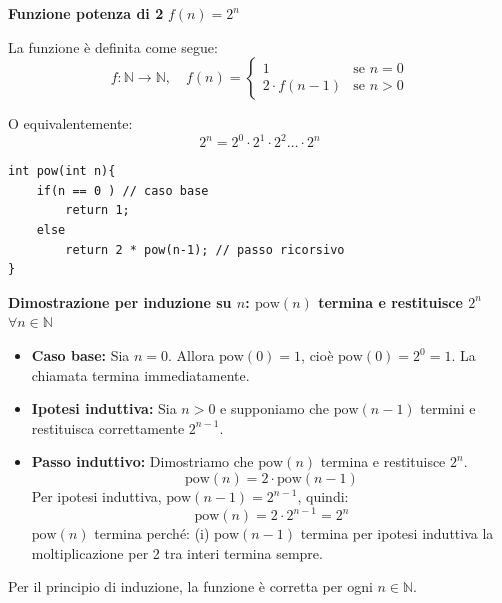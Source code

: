 \begin{esempio}
\textbf{Funzione potenza di 2} $f(n)= 2^n$

La funzione è definita come segue:
\[
f: \mathbb{N} \to \mathbb{N}, \quad f(n)= 
\begin{cases}
    1  & \text{se } n = 0 \\
    2 \cdot f(n-1)  & \text{se } n >0
\end{cases}
\]

O equivalentemente:
\[
2^n = 2^0 \cdot 2^1 \cdot 2^2 \ldots \cdot 2^n
\]

\begin{tcolorbox}[
    colback=backcolour, 
    colframe=framegray, 
    boxrule=0.5pt, 
    sharp corners,
    left=5mm, right=5mm, 
    top=5mm, bottom=5mm,
    width=\linewidth
]
\begin{lstlisting}
int pow(int n){
    if(n == 0 ) // caso base
        return 1;
    else 
        return 2 * pow(n-1); // passo ricorsivo
}
\end{lstlisting}
\end{tcolorbox}


\textbf{Dimostrazione per induzione su $n$: $\text{pow}(n)$ termina e restituisce $2^n$ $\forall n \in \mathbb{N}$}

\begin{itemize}
    \item \textbf{Caso base:} Sia $n=0$. Allora $\text{pow}(0)=1$, cioè $\text{pow}(0)=2^0=1$. La chiamata termina immediatamente.
    
    \item \textbf{Ipotesi induttiva:} Sia $n>0$ e supponiamo che $\text{pow}(n-1)$ termini e restituisca correttamente $2^{n-1}$.
    
    \item \textbf{Passo induttivo:} Dimostriamo che $\text{pow}(n)$ termina e restituisce $2^n$.
    \[
    \text{pow}(n)= 2 \cdot \text{pow}(n-1) 
    \]
    Per ipotesi induttiva, $\text{pow}(n-1)=2^{n-1}$, quindi:
    \[
    \text{pow}(n)= 2 \cdot 2^{n-1} = 2^n
    \]
    $\text{pow}(n)$ termina perché: (i) $\text{pow}(n-1)$ termina per ipotesi induttiva la moltiplicazione per 2 tra interi termina sempre.
\end{itemize}

Per il principio di induzione, la funzione è corretta per ogni $n \in \mathbb{N}$.

\end{esempio}






